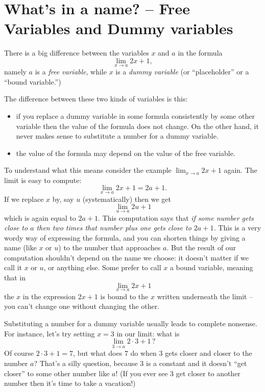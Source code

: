 \section{What's in a name? -- Free Variables and Dummy variables} 
\label{sec:free-versus-dummy-variables}%
There is a big difference between the variables $x$ and $a$ in the formula
\[
\lim_{x\to a} 2x+1,
\]
namely $a$ is a \emph{free variable}, while $x$ is a \emph{dummy variable}
(or ``placeholder'' or a ``bound variable.'')

The difference between these two kinds of variables is this:
\begin{itemize}
\item if you replace a dummy variable in some formula consistently by some
  other variable then the value of the formula does not change.  On the
  other hand, it never makes sense to substitute a number for a dummy
  variable.

\item the value of the formula may depend on the value of the free
  variable.
\end{itemize}
To understand what this means consider the example $\lim_{x\to a}2x+1$
again.  The limit is easy to compute:
\[
\lim_{x\to a}2x+1 = 2a+1.
\]
If we replace $x$ by, say $u$ (systematically) then we get
\[
\lim_{u\to a} 2u+1
\]
which is again equal to $2a+1$.  This computation says that \textit{if some
  number gets close to $a$ then two times that number plus one gets close
  to $2a+1$.}  This is a very wordy way of expressing the formula, and you
can shorten things by giving a name (like $x$ or $u$) to the number that
approaches $a$.  But the result of our computation shouldn't depend on the
name we choose: it doesn't matter if we call it $x$ or $u$, or anything else.
Some prefer to call $x$ a bound variable, meaning that in
\[
\lim_{x\to a} 2x+1
\]
the $x$ in the expression $2x+1$ is bound to the $x$ written underneath the
limit -- you can't change one without changing the other.

Substituting a number for a dummy variable usually leads to complete
nonsense.  For instance, let's try setting $x=3$ in our limit: what is
\[
\lim_{3\to a}2\cdot 3+1\,?
\]
Of course $2\cdot 3+1 = 7$, but what does $7$ do when $3$ gets closer and
closer to the number $a$?  That's a silly question, because 3 is a constant
and it doesn't ``get closer'' to some other number like $a$!  (If you ever
see 3 get closer to another number then it's time to take a vacation!)

